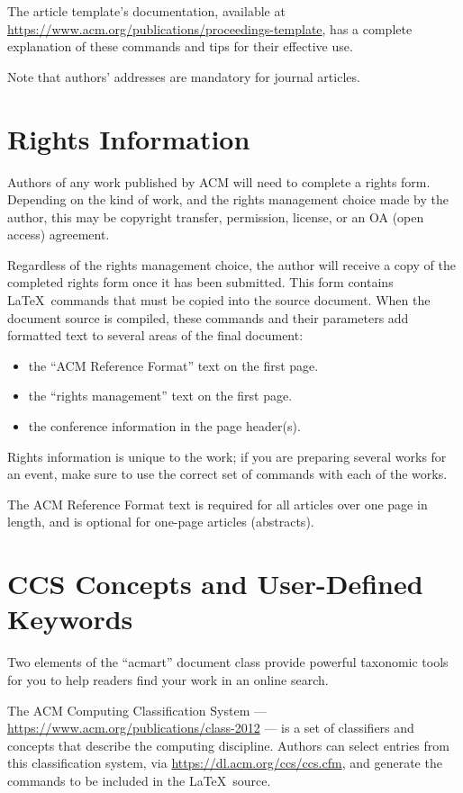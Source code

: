 \documentclass[sigconf,review]{acmart}
\begin{document}
The article template's documentation, available at
\url{https://www.acm.org/publications/proceedings-template}, has a
complete explanation of these commands and tips for their effective
use.

Note that authors' addresses are mandatory for journal articles.

\section{Rights Information}

Authors of any work published by ACM will need to complete a rights
form. Depending on the kind of work, and the rights management choice
made by the author, this may be copyright transfer, permission,
license, or an OA (open access) agreement.

Regardless of the rights management choice, the author will receive a
copy of the completed rights form once it has been submitted. This
form contains \LaTeX\ commands that must be copied into the source
document. When the document source is compiled, these commands and
their parameters add formatted text to several areas of the final
document:
\begin{itemize}
\item the ``ACM Reference Format'' text on the first page.
\item the ``rights management'' text on the first page.
\item the conference information in the page header(s).
\end{itemize}

Rights information is unique to the work; if you are preparing several
works for an event, make sure to use the correct set of commands with
each of the works.

The ACM Reference Format text is required for all articles over one
page in length, and is optional for one-page articles (abstracts).

\section{CCS Concepts and User-Defined Keywords}

Two elements of the ``acmart'' document class provide powerful
taxonomic tools for you to help readers find your work in an online
search.

The ACM Computing Classification System ---
\url{https://www.acm.org/publications/class-2012} --- is a set of
classifiers and concepts that describe the computing
discipline. Authors can select entries from this classification
system, via \url{https://dl.acm.org/ccs/ccs.cfm}, and generate the
commands to be included in the \LaTeX\ source.
\end{document}
